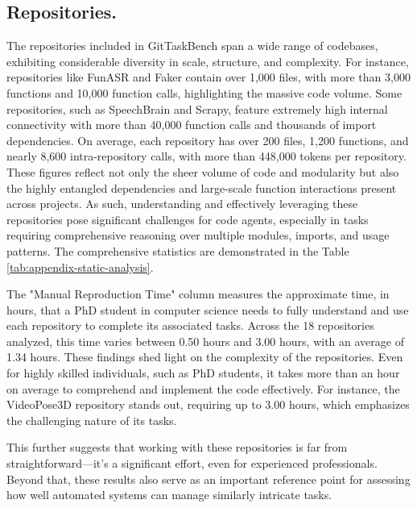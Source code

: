 \subsection*{Repositories.}
The repositories included in GitTaskBench span a wide range of codebases, exhibiting considerable diversity in scale, structure, and complexity. For instance, repositories like FunASR and Faker contain over 1,000 files, with more than 3,000 functions and 10,000 function calls, highlighting the massive code volume. Some repositories, such as SpeechBrain and Scrapy, feature extremely high internal connectivity with more than 40,000 function calls and thousands of import dependencies. On average, each repository has over 200 files, 1,200 functions, and nearly 8,600 intra-repository calls, with more than 448,000 tokens per repository. These figures reflect not only the sheer volume of code and modularity but also the highly entangled dependencies and large-scale function interactions present across projects. As such, understanding and effectively leveraging these repositories pose significant challenges for code agents, especially in tasks requiring comprehensive reasoning over multiple modules, imports, and usage patterns. The comprehensive statistics are demonstrated in the Table \ref{tab:appendix-static-analysis}.

The "Manual Reproduction Time" column measures the approximate time, in hours, that a PhD student in computer science needs to fully understand and use each repository to complete its associated tasks. Across the 18 repositories analyzed, this time varies between 0.50 hours and 3.00 hours, with an average of 1.34 hours.
These findings shed light on the complexity of the repositories. Even for highly skilled individuals, such as PhD students, it takes more than an hour on average to comprehend and implement the code effectively. For instance, the VideoPose3D repository stands out, requiring up to 3.00 hours, which emphasizes the challenging nature of its tasks.

This further suggests that working with these repositories is far from straightforward---it’s a significant effort, even for experienced professionals. Beyond that, these results also serve as an important reference point for assessing how well automated systems can manage similarly intricate tasks.


